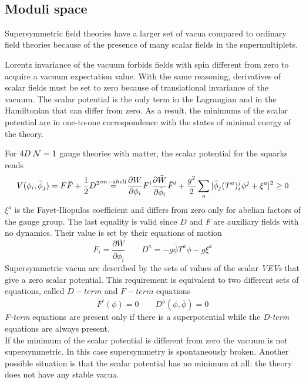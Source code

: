 \






\subsection{Moduli space}
Supersymmetric field theories have a larger set of vacua compared to ordinary field theories because of the presence of many scalar fields in the supermultiplets.

Lorentz invariance of the vacuum forbids fields with spin different from zero to acquire a vacuum expectation value.
With the same reasoning, derivatives of scalar fields must be set to zero because of translational invariance of the vacuum.
The scalar potential is the only term in the Lagrangian and in the Hamiltonian that can differ from zero.
As a result, the minimums of the scalar potential are in one-to-one correspondence with the states of minimal energy of the theory.

For $4D \; \mathcal{N}=1$ gauge theories with matter, the scalar potential for the squarks reads
\begin{equation}
 V ( \phi_i, \bar{\phi}_j) = F \bar{F} + \frac{1}{2} D^2  \quad \overset{\mathclap{on-shell}}=   \quad \frac{\partial W}{\partial \phi_i} F^i \frac{\partial \bar{W}} {\partial \bar{\phi}_i} \bar{F}^i + \frac{g^2}{2} \sum_a | \bar{\phi}_j (T^a)^j_i \phi^j + \xi^a | ^2  \geq 0
\end{equation} 
$\xi^a$ is the Fayet-Iliopulos coefficient and differs from zero only for abelian factors of the gauge group.
The last equality is valid since $D$ and $F$ are auxiliary fields with no dynamics.
Their value is set by their equations of motion
\begin{equation}
 \bar{F}_i  = \frac{\partial \bar{W}} {\partial \bar{\phi}_i} \qquad D^a = - g \bar{\phi} T^a \phi - g \xi^a 
\end{equation}
Supersymmetric vacua are described by the sets of values of the scalar \emph{VEVs} that give a zero scalar potential. 
This requirement is equivalent to two different sets of equations, called $D-term$ and $F-term $ equations
\begin{equation}
\bar{F}^i ( \phi) = 0 \qquad D^a (\phi , \bar{\phi}) = 0
\end{equation}
\emph{F-term} equations are present only if there is a superpotential while the \emph{D-term} equations are always present.\\
If the minimum of the scalar potential is different from zero the vacuum is not supersymmetric. 
In this case supersymmetry is spontaneously broken.
Another possible situation is that the scalar potential has no minimum at all: the theory does not have any stable vacua.

